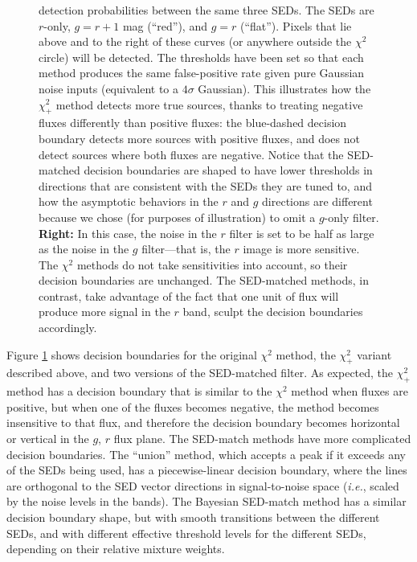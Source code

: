 \documentclass[11pt,letterpaper,linenumbers]{aastex63}
\newcommand{\latin}[1]{\emph{#1}}
\newcommand{\ie}{\latin{i.e.}}
\newcommand{\chipos}{\chi_+}
\begin{document}
\begin{figure}
{    detection probabilities between the same three SEDs.  The SEDs are
    $r$-only, $g = r + 1$ mag (``red''), and $g=r$ (``flat'').  Pixels
    that lie above and to the right of these curves (or anywhere
    outside the $\chi^2$ circle) will be detected.  The thresholds
    have been set so that each method produces the same false-positive
    rate given pure Gaussian noise inputs (equivalent to a $4 \sigma$
    Gaussian).  This illustrates how the $\chipos^2$ method detects
    more true sources, thanks to treating negative fluxes differently
    than positive fluxes: the blue-dashed decision boundary detects
    more sources with positive fluxes, and does not detect sources
    where both fluxes are negative.  Notice that the SED-matched
    decision boundaries are shaped to have lower thresholds in
    directions that are consistent with the SEDs they are tuned to,
    and how the asymptotic behaviors in the $r$ and $g$ directions are
    different because we chose (for purposes of illustration) to omit
    a $g$-only filter.  \textbf{Right:} In this case, the noise in the
    $r$ filter is set to be half as large as the noise in the $g$
    filter---that is, the $r$ image is more sensitive.  The $\chi^2$
    methods do not take sensitivities into account, so their decision
    boundaries are unchanged.  The SED-matched methods, in contrast,
    take advantage of the fact that one unit of flux will produce more
    signal in the $r$ band, sculpt the decision boundaries
    accordingly.
  \label{fig:chipos_boundary}}
\end{figure}

Figure \ref{fig:chipos_boundary} shows decision boundaries for the
original $\chi^2$ method, the $\chipos^2$ variant described above, and
two versions of the SED-matched filter.  As expected, the $\chipos^2$
method has a decision boundary that is similar to the $\chi^2$ method
when fluxes are positive, but when one of the fluxes becomes negative,
the method becomes insensitive to that flux, and therefore the
decision boundary becomes horizontal or vertical in the $g$, $r$ flux
plane.  The SED-match methods have more complicated decision
boundaries.  The ``union'' method, which accepts a peak if it exceeds
any of the SEDs being used, has a piecewise-linear decision boundary,
where the lines are orthogonal to the SED vector directions in
signal-to-noise space (\ie, scaled by the noise levels in the bands).
The Bayesian SED-match method has a similar decision boundary shape,
but with smooth transitions between the different SEDs, and with
different effective threshold levels for the different SEDs, depending
on their relative mixture weights.
\end{document}
